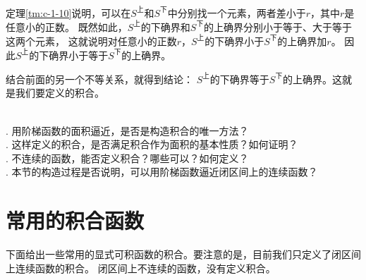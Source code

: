 \documentclass[12pt,UTF8,fontset=none]{ctexbook}
\begin{document}
\begin{appendix}
定理\ref{tm:c-1-10}说明，可以在$S^{\text{上}}$和$S^{\text{下}}$中分别找一个元素，两者差小于$r$，其中$r$是任意小的正数。
既然如此，$S^{\text{上}}$的下确界和$S^{\text{下}}$的上确界分别小于等于、大于等于这两个元素，
这就说明对任意小的正数$r$，$S^{\text{上}}$的下确界小于$S^{\text{下}}$的上确界加$r$。
因此$S^{\text{上}}$的下确界小于等于$S^{\text{下}}$的上确界。

结合前面的另一个不等关系，就得到结论：
$S^{\text{上}}$的下确界等于$S^{\text{下}}$的上确界。这就是我们要定义的积合。

\begin{sk}
    \mbox{} \\
    . 用阶梯函数的面积逼近，是否是构造积合的唯一方法？ \\
    . 这样定义的积合，是否满足积合作为面积的基本性质？如何证明？\\
    . 不连续的函数，能否定义积合？哪些可以？如何定义？\\
    . 本节的构造过程是否说明，可以用阶梯函数逼近闭区间上的连续函数？
\end{sk}

\section{常用的积合函数}

下面给出一些常用的显式可积函数的积合。要注意的是，目前我们只定义了闭区间上连续函数的积合。
闭区间上不连续的函数，没有定义积合。


\end{appendix}
\end{document}
